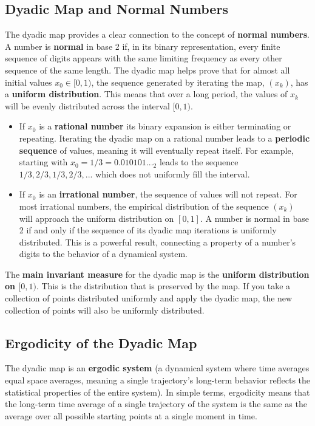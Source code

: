 \documentclass[12pt,a4paper]{article}
\begin{document}
\subsection{Dyadic Map and Normal Numbers}

The dyadic map provides a clear connection to the concept of \textbf{normal numbers}. A number is \textbf{normal} in base 2 if, in its binary representation, every finite sequence of digits appears with the same limiting frequency as every other sequence of the same length. The dyadic map helps prove that for almost all initial values $x_0 \in [0, 1)$, the sequence generated by iterating the map, $(x_k)$, has a \textbf{uniform distribution}. This means that over a long period, the values of $x_k$ will be evenly distributed across the interval $[0, 1)$.

\begin{itemize}
    \item If $x_0$ is a \textbf{rational number} 
    its binary expansion is either terminating or repeating. Iterating the dyadic map on a rational number leads to a \textbf{periodic sequence} of values, meaning it will eventually repeat itself. For example, starting with $x_0 = 1/3 = 0.010101..._2$ leads to the sequence $1/3, 2/3, 1/3, 2/3, ...$ which does not uniformly fill the interval.
    \item If $x_0$ is an \textbf{irrational number}, the sequence of values will not repeat. For most irrational numbers, the empirical distribution of the sequence $(x_k)$ will approach the uniform distribution on $[0,1]$. A number is normal in base 2 if and only if the sequence of its dyadic map iterations is uniformly distributed. This is a powerful result, connecting a property of a number's digits to the behavior of a dynamical system.
\end{itemize}

The \textbf{main invariant measure} for the dyadic map is the \textbf{uniform distribution on $[0, 1)$}. This is the distribution that is preserved by the map. If you take a collection of points distributed uniformly and apply the dyadic map, the new collection of points will also be uniformly distributed.

\subsection{Ergodicity of the Dyadic Map}

The dyadic map is an \textbf{ergodic system} (a dynamical system where time averages equal space averages, meaning a single trajectory's long-term behavior reflects the statistical properties of the entire system). In simple terms, ergodicity means that the long-term time average of a single trajectory of the system is the same as the average over all possible starting points at a single moment in time.
\end{document}

